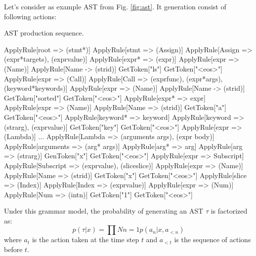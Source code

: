 Let's consider as example AST from Fig. \ref{fig:ast}. It generation consist of following actions:

\begin{codelist}{AST production sequence.}
\begin{verbnobox}[\verbarg]
ApplyRule[root => (stmt*)]
    ApplyRule[stmt => (Assign)]
        ApplyRule[Assign => (expr*{targets}), (expr{value})]
            ApplyRule[expr* => (expr)]
                ApplyRule[expr => (Name)]
                    ApplyRule[Name -> (str{id})]
                        GetToken["ls"]
                        GetToken["<eos>"]
            ApplyRule[expr => (Call)]
                ApplyRule[Call => (expr{func}), (expr*{args}), (keyword*{keywords})]
                    ApplyRule[expr => (Name)]
                        ApplyRule[Name -> (str{id})]
                            GetToken["sorted"]
                            GetToken["<eos>"]
                    ApplyRule[expr* => expr]
                        ApplyRule[expr => (Name)]
                            ApplyRule[Name => (str{id})]
                                GetToken["a"]
                                GetToken["<eos>"]
                    ApplyRule[keyword* => keyword]
                        ApplyRule[keyword => (str{arg}), (expr{value})]
                            GetToken["key"]
                            GetToken["<eos>"]
                            ApplyRule[expr => (Lambda)]
...
ApplyRule[Lambda => (arguments args), (expr body)]
    ApplyRule[arguments => (arg* args)]
        ApplyRule[arg* => arg]
            ApplyRule[arg => (str{arg})]
                GenToken["x"]
                GetToken["<eos>"]
    ApplyRule[expr => Subscript]
        ApplyRule[Subscript => (expr{value}), (slice{slice})]
            ApplyRule[expr => (Name)]
                ApplyRule[Name => (str{id})]
                    GetToken["x"]
                    GetToken["<eos>"]
            ApplyRule[slice => (Index)]
                ApplyRule[Index => (expr{value})]
                    ApplyRule[expr => (Num)]
                        ApplyRule[Num => (int{n})]
                            GetToken["1"]
                            GetToken["<eos>"]
\end{verbnobox}
\label{code:ast_production}
\end{codelist}

Under this grammar model, the probability of generating an AST $\tau$ is factorized as:
\begin{equation}
p(\tau|x) = \prod{N}{n=1} p(a_n|x, a_{<n})
\label{eqn:tree_probability}
\end{equation}
where $a_t$ is the action taken at the time step $t$ and $a_{<t}$ is the sequence of actions before $t$. 

